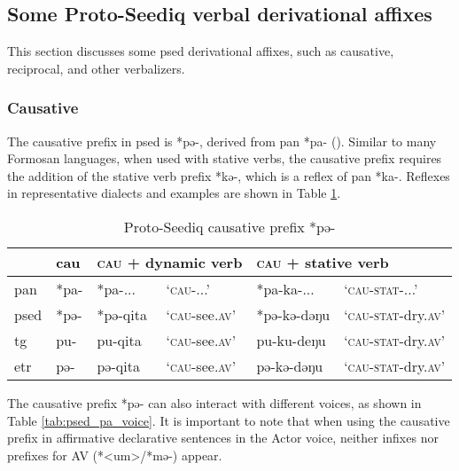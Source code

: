 \subsection{Some Proto-Seediq verbal derivational affixes} \label{sec:psed_deri_affixes}

This section discusses some \acl{psed} derivational affixes, such as causative, reciprocal, and other verbalizers.

\subsubsection{Causative}

The causative prefix in \acl{psed} is *pə-, derived from \acl{pan} *pa- (\cite{ACD,ross_zeitoun2023}). Similar to many Formosan languages, when used with stative verbs, the causative prefix requires the addition of the stative verb prefix *kə-, which is a reflex of \ac{pan} *ka-. Reflexes in representative dialects and examples are shown in Table \ref{tab:psed_pa}.

\begin{table}[!htbp]
\centering
\caption{Proto-Seediq causative prefix *pə-}
\label{tab:psed_pa}
\begin{tabular}{llllll}
\hline
 & \acs{cau} & \multicolumn{2}{l}{\textsc{cau} + dynamic verb} & \multicolumn{2}{l}{\textsc{cau} + stative verb} \\ \hline
\ac{pan}  & *pa- & *pa-...  & `\textsc{cau}-...' & *pa-ka-...  & `\textsc{cau-stat}-...'  \\
\ac{psed} & *pə- & *pə-qita & `\textsc{cau}-see.\textsc{av}' & *pə-kə-dəŋu & `\textsc{cau-stat}-dry.\textsc{av}' \\
\ac{tg}   & pu-  & pu-qita  & `\textsc{cau}-see.\textsc{av}' & pu-ku-deŋu  & `\textsc{cau-stat}-dry.\textsc{av}' \\
\ac{etr}  & pə-  & pə-qita  & `\textsc{cau}-see.\textsc{av}' & pə-kə-dəŋu  & `\textsc{cau-stat}-dry.\textsc{av}' \\ \hline
\end{tabular}
\end{table}

The causative prefix *pə- can also interact with different voices, as shown in Table \ref{tab:psed_pa_voice}. It is important to note that when using the causative prefix in affirmative declarative sentences in the Actor voice, neither infixes nor prefixes for AV (*<um>/*mə-) appear.

